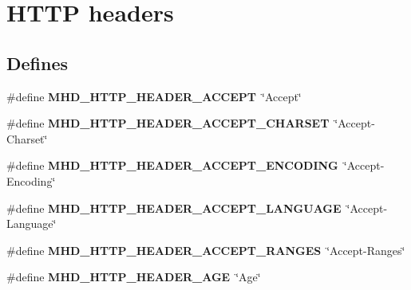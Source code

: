 \hypertarget{group__headers}{\section{\-H\-T\-T\-P headers}
\label{group__headers}
}
\subsection*{\-Defines}
\begin{DoxyCompactItemize}
\item 
\hypertarget{group__headers_ga51b07a7a89cbfd0e873dc111ae3cef6c}{\#define {\bfseries \-M\-H\-D\-\_\-\-H\-T\-T\-P\-\_\-\-H\-E\-A\-D\-E\-R\-\_\-\-A\-C\-C\-E\-P\-T}~\char`\"{}\-Accept\char`\"{}}\label{group__headers_ga51b07a7a89cbfd0e873dc111ae3cef6c}

\item 
\hypertarget{group__headers_gae300149a525831e149723e85e2486b43}{\#define {\bfseries \-M\-H\-D\-\_\-\-H\-T\-T\-P\-\_\-\-H\-E\-A\-D\-E\-R\-\_\-\-A\-C\-C\-E\-P\-T\-\_\-\-C\-H\-A\-R\-S\-E\-T}~\char`\"{}\-Accept-\/\-Charset\char`\"{}}\label{group__headers_gae300149a525831e149723e85e2486b43}

\item 
\hypertarget{group__headers_gada3c8b9f4e4f5370023a830abc548501}{\#define {\bfseries \-M\-H\-D\-\_\-\-H\-T\-T\-P\-\_\-\-H\-E\-A\-D\-E\-R\-\_\-\-A\-C\-C\-E\-P\-T\-\_\-\-E\-N\-C\-O\-D\-I\-N\-G}~\char`\"{}\-Accept-\/\-Encoding\char`\"{}}\label{group__headers_gada3c8b9f4e4f5370023a830abc548501}

\item 
\hypertarget{group__headers_ga3cfe4387e9f457556f94e1ff5c4e399e}{\#define {\bfseries \-M\-H\-D\-\_\-\-H\-T\-T\-P\-\_\-\-H\-E\-A\-D\-E\-R\-\_\-\-A\-C\-C\-E\-P\-T\-\_\-\-L\-A\-N\-G\-U\-A\-G\-E}~\char`\"{}\-Accept-\/\-Language\char`\"{}}\label{group__headers_ga3cfe4387e9f457556f94e1ff5c4e399e}

\item 
\hypertarget{group__headers_gabd76ebf9d17fbf3c4889ac0d5e314d76}{\#define {\bfseries \-M\-H\-D\-\_\-\-H\-T\-T\-P\-\_\-\-H\-E\-A\-D\-E\-R\-\_\-\-A\-C\-C\-E\-P\-T\-\_\-\-R\-A\-N\-G\-E\-S}~\char`\"{}\-Accept-\/\-Ranges\char`\"{}}\label{group__headers_gabd76ebf9d17fbf3c4889ac0d5e314d76}

\item 
\hypertarget{group__headers_gaacbf58e743275f88c5e68b439c51eb73}{\#define {\bfseries \-M\-H\-D\-\_\-\-H\-T\-T\-P\-\_\-\-H\-E\-A\-D\-E\-R\-\_\-\-A\-G\-E}~\char`\"{}\-Age\char`\"{}}\label{group__headers_gaacbf58e743275f88c5e68b439c51eb73}


\end{DoxyCompactItemize}
